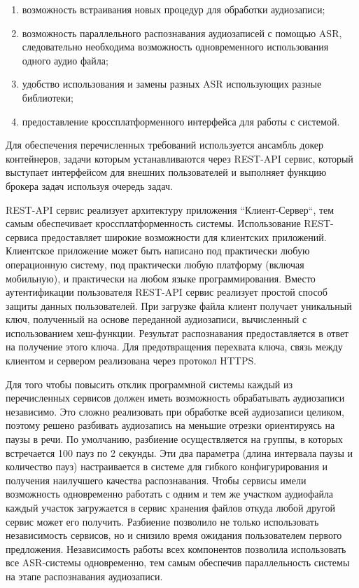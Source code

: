 \documentclass[conference]{IEEEtran}
\begin{document}
\begin{enumerate}
\item возможность встраивания новых процедур для обработки аудиозаписи;
\item возможность параллельного распознавания аудиозаписей с помощью ASR, следовательно необходима возможность одновременного использования одного аудио файла;
\item удобство использования и замены разных ASR использующих разные библиотеки;
\item предоставление кроссплатформенного интерфейса для работы с системой.
\end{enumerate}

Для обеспечения перечисленных требований используется ансамбль докер контейнеров, задачи которым устанавливаются через REST-API сервис,
который выступает интерфейсом для внешних пользователей и выполняет функцию брокера задач используя очередь задач.

REST-API сервис реализует архитектуру приложения ``Клиент-Сервер``, тем самым обеспечивает кроссплатформенность системы.
Использование REST-сервиса предоставляет широкие возможности для клиентских приложений. Клиентское приложение может быть написано под практически любую операционную систему, под практически любую платформу (включая мобильную), и практически на любом языке программирования.
Вместо аутентификации пользователя REST-API сервис реализует простой способ защиты данных пользователей.
При загрузке файла клиент получает уникальный ключ, полученный на основе переданной аудиозаписи, вычисленный с использованием хеш-функции.
Результат распознавания предоставляется в ответ на получение этого ключа.
Для предотвращения перехвата ключа, связь между клиентом и сервером реализована через протокол HTTPS\@.

Для того чтобы повысить отклик программной системы каждый из перечисленных сервисов должен иметь возможность обрабатывать аудиозаписи независимо.
Это сложно реализовать при обработке всей аудиозаписи целиком, поэтому решено разбивать аудиозапись на меньшие отрезки ориентируясь на паузы в речи.
По умолчанию, разбиение осуществляется на группы, в которых встречается 100 пауз по 2 секунды. Эти два параметра (длина интервала паузы и количество пауз) настраивается в системе для гибкого конфигурирования и получения наилучшего качества распознавания.
Чтобы сервисы имели возможность одновременно работать с одним и тем же участком аудиофайла каждый участок загружается в сервис хранения файлов откуда любой другой сервис может его получить.
Разбиение позволило не только использовать независимость сервисов, но и снизило время ожидания пользователем первого предложения.
Независимость работы всех компонентов позволила использовать все ASR-системы одновременно, тем самым обеспечив параллельность системы на этапе распознавания аудиозаписи.
\end{document}
